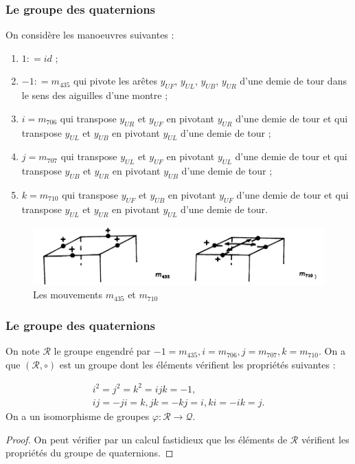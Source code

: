 \documentclass[10pt,notheorems]{beamer}
\theoremstyle{plain}
\theoremstyle{definition}
\theoremstyle{plain}
\theoremstyle{plain}
\theoremstyle{plain}
\theoremstyle{remark}
\begin{document}
\begin{frame}
  \frametitle{Le groupe des quaternions}
  On considère les manoeuvres suivantes :
  \begin{enumerate}
    \item $1 : = id$ ;
    \item $-1: = m _{435}$ qui pivote les arêtes $y _{UF}$, $y _{UL}$, $y _{UB}$, $y _{UR}$ d'une demie de tour dans le sens des aiguilles d'une montre ;
    \item $i = m _{706}$ qui transpose $y _{UR}$ et $y _{UF}$ en pivotant $y _{UR}$ d'une demie de tour et qui transpose $y _{UL}$ et $y _{UB}$ en pivotant $ y _{UL}$ d'une demie de tour ;
    \item $j = m _{707}$ qui transpose $y _{UL}$ et $y _{UF}$ en pivotant $y _{UL}$ d'une demie de tour et qui transpose $y _{UB}$ et $ y _{UR}$ en pivotant $ y _{UB}$ d'une demie de tour ;
    \item $k = m _{710}$ qui transpose $y _{UF}$ et $y _{UB}$ en pivotant $y _{UF}$ d'une demie de tour et qui transpose $y _{UL}$ et $y _{UR}$ en pivotant $ y _{UL}$ d'une demie de tour.
  \end{enumerate}

  \begin{figure}[h!]
    \centering
    \includegraphics[scale=0.2]{figures/manip_quaternions.png}
    \caption{Les mouvements $m _{435}$ et $m _{710}$}
    \label{}
  \end{figure}
\end{frame}

\begin{frame}
  \frametitle{Le groupe des quaternions}

  On note $\mathcal{R}$ le groupe engendré par $-1 = m _{435}, i = m _{706}, j= m _{707}, k= m _{710}$. On a que $(\mathcal{R}, \circ)$ est un groupe dont les éléments vérifient les propriétés suivantes :

  \begin{gather}
    i ^2 = j ^2 = k ^2 = ijk = -1, \label{quaternions}\\
    ij = -ji = k, jk = -kj = i, ki = -ik = j. \label{quaternions2}
  \end{gather}
  On a un isomorphisme de groupes $\varphi : \mathcal{R} \to \mathcal{Q}$.

  \begin{proof}
  On peut vérifier par un calcul fastidieux que les éléments de $\mathcal{R}$ vérifient les propriétés du groupe de quaternions.
  \end{proof}
\end{frame}
\end{document}
